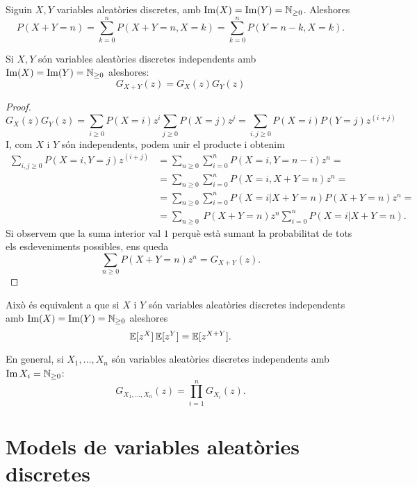 \begin{obs}
    Siguin $X, Y$ variables aleatòries discretes, amb $\operatorname{Im}(X) = \operatorname{Im}(Y) =
    \mathbb{N}_{\geq 0}$. Aleshores
    \[
        P(X+Y = n) = \sum_{k = 0}^{n} P(X+Y = n, X = k) = 
        \sum_{k = 0}^{n} P(Y = n-k, X = k). 
    \]
\end{obs}

\begin{prop}
    Si $X, Y$ són variables aleatòries discretes independents amb $\operatorname{Im}(X) = \operatorname{Im}(Y) =
    \mathbb{N}_{\geq 0}$ aleshores:
    \[
        G_{X+Y}(z) = G_X(z)G_Y(z)
    \]
\end{prop}

\begin{proof}
    \[
        G_X(z)G_Y(z) = \sum_{i \geq 0} P(X = i) z^i  \sum_{j \geq 0} P(X = j) z^j =
         \sum_{i, j \geq 0} P(X = i)P(Y = j) z^{(i+j)}
    \]
    I, com $X$ i $Y$ són independents, podem unir el producte i obtenim
    \begin{align*} 
        \sum_{i, j \geq 0} P(X = i, Y = j) z^{(i+j)} & = \sum_{n \geq 0} \sum_{i = 0}^n
        P(X = i, Y = n-i)z^n =\\
        &= \sum_{n \geq 0} \sum_{i = 0}^n P(X = i, X+Y = n)z^n =\\
        & = \sum_{n \geq 0} \sum_{i = 0}^n P(X = i | X+Y = n) P(X+Y = n)z^n = \\
        & = \sum_{n \geq 0} \ P(X+Y = n)z^n \sum_{i = 0}^n P(X = i | X+Y = n).
    \end{align*}
    Si observem que la suma interior val $1$ perquè està sumant la probabilitat de tots
    els esdeveniments possibles, ens queda
    \[
        \sum_{n \geq 0} P(X+Y = n)z^n = G_{X+Y}(z).
    \]
\end{proof}

\begin{obs}
    Això \'es equivalent a que si $X$ i $Y$ són variables aleatòries discretes independents
    amb $\operatorname{Im}(X) = \operatorname{Im}(Y) = \mathbb{N}_{\geq 0}$ aleshores
    \[
        \operatorname{\mathbb{E}}[z^X]\operatorname{\mathbb{E}}[z^Y] = \operatorname{\mathbb{E}}[z^{X+Y}].
    \]
\end{obs}

\begin{obs}
    En general, si $X_1, \dots, X_n$ són variables aleatòries discretes independents amb
    $\operatorname{Im} X_i = \mathbb{N}_{\geq 0}$:
    \[
        G_{X_1,\dots,X_n}(z) = \prod_{i = 1}^n G_{X_i}(z).
    \]
\end{obs}

\section{Models de variables aleatòries discretes}

